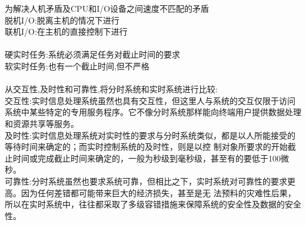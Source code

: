 \documentclass[UTF8]{article}
\begin{document}
    为解决人机矛盾及CPU和I/O设备之间速度不匹配的矛盾\\
    脱机I/O:脱离主机的情况下进行\\
    联机I/O:在主机的直接控制下进行\\
    \\
    硬实时任务:系统必须满足任务对截止时间的要求\\
    软实时任务:也有一个截止时间,但不严格\\
    \\
    从交互性,及时性和可靠性,将分时系统和实时系统进行比较:\\
    交互性:实时信息处理系统虽然也具有交互性，但这里人与系统的交互仅限于访问系统中某些特定的专用服务程序。它不像分时系统那样能向终端用户提供数据处理和资源共享等服务。\\
    及时性:实时信息处理系统对实时性的要求与分时系统类似，都是以人所能接受的等待时间来确定的；而实时控制系统的及时性，则是以控 制对象所要求的开始截止时间或完成截止时间来确定的，一般为秒级到毫秒级，甚至有的要低于100微秒。\\
    可靠性:分时系统虽然也要求系统可靠，但相比之下，实时系统对可靠性的要求更高。因为任何差错都可能带来巨大的经济损失，甚至是无 法预料的灾难性后果，所以在实时系统中，往往都采取了多级容错措施来保障系统的安全性及数据的安全性。\\
    \\
    
\end{document}
